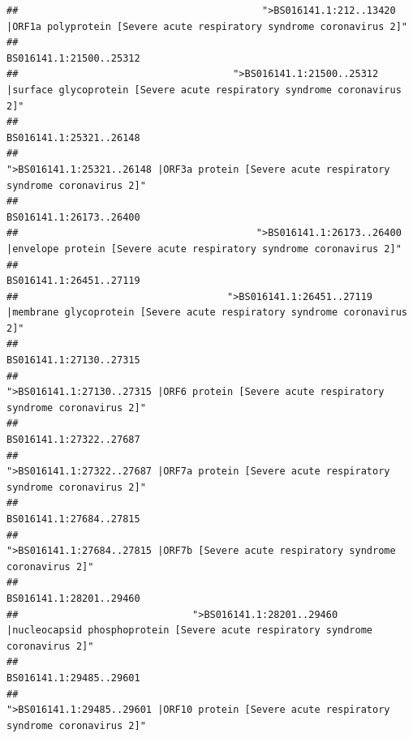 \documentclass[
]{article}
\begin{document}
\begin{verbatim}
##                                          ">BS016141.1:212..13420 |ORF1a polyprotein [Severe acute respiratory syndrome coronavirus 2]" 
##                                                                                                                BS016141.1:21500..25312 
##                                     ">BS016141.1:21500..25312 |surface glycoprotein [Severe acute respiratory syndrome coronavirus 2]" 
##                                                                                                                BS016141.1:25321..26148 
##                                            ">BS016141.1:25321..26148 |ORF3a protein [Severe acute respiratory syndrome coronavirus 2]" 
##                                                                                                                BS016141.1:26173..26400 
##                                         ">BS016141.1:26173..26400 |envelope protein [Severe acute respiratory syndrome coronavirus 2]" 
##                                                                                                                BS016141.1:26451..27119 
##                                    ">BS016141.1:26451..27119 |membrane glycoprotein [Severe acute respiratory syndrome coronavirus 2]" 
##                                                                                                                BS016141.1:27130..27315 
##                                             ">BS016141.1:27130..27315 |ORF6 protein [Severe acute respiratory syndrome coronavirus 2]" 
##                                                                                                                BS016141.1:27322..27687 
##                                            ">BS016141.1:27322..27687 |ORF7a protein [Severe acute respiratory syndrome coronavirus 2]" 
##                                                                                                                BS016141.1:27684..27815 
##                                                    ">BS016141.1:27684..27815 |ORF7b [Severe acute respiratory syndrome coronavirus 2]" 
##                                                                                                                BS016141.1:28201..29460 
##                              ">BS016141.1:28201..29460 |nucleocapsid phosphoprotein [Severe acute respiratory syndrome coronavirus 2]" 
##                                                                                                                BS016141.1:29485..29601 
##                                            ">BS016141.1:29485..29601 |ORF10 protein [Severe acute respiratory syndrome coronavirus 2]" 

\end{verbatim}
\end{document}
